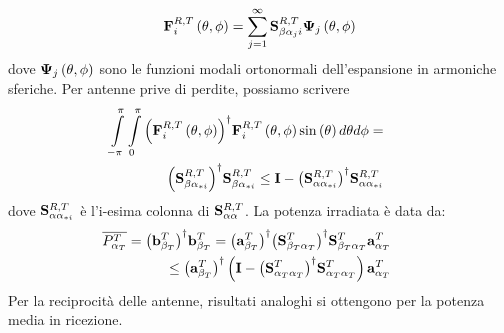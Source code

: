 \documentclass[technote]{IEEEtran}
\begin{document}
\[{\bf{F}}_i^{R,T}\left( {\theta ,\phi } \right) = \sum\limits_{j = 1}^\infty  {{\bf{S}}_{{\beta}{\alpha_ji}}^{R,T}{{\bf{\Psi }}_j}\left( {\theta ,\phi } \right)} \]
dove ${{\bf{\Psi }}_j}\left( {\theta ,\phi } \right)$ sono le funzioni modali ortonormali dell'espansione in armoniche sferiche. Per antenne prive di perdite, possiamo scrivere \cite{Was2005}
\begin{eqnarray}
\label{eq:patternOrtogonalization}
& & \hspace{-1cm} \int\limits_{ - \pi }^\pi  {\int\limits_0^\pi  {{{\left( {{\bf{F}}_i^{R,T}\left( {\theta ,\phi } \right)} \right)}^\dagger}{\bf{F}}_i^{R,T}\left( {\theta ,\phi } \right)} } \sin \left( \theta  \right)d\theta d\phi = \nonumber \\ 
& & {\left( {{\bf{S}}_{\beta {\alpha _{*i}}}^{R,T}} \right)^\dagger}{\bf{S}}_{\beta {\alpha _{*i}}}^{R,T} \le {\bf{I}} - {\left( {{\bf{S}}_{\alpha {\alpha _{*i}}}^{R,T}} \right)^\dagger}{\bf{S}}_{\alpha {\alpha _{*i}}}^{R,T}
\end{eqnarray} dove ${\bf{S}}_{\alpha {\alpha _{*i}}}^{R,T}$ è l'i-esima colonna di ${\bf{S}}_{\alpha \alpha }^{R,T}$. La potenza irradiata è data da:
\begin{eqnarray}
& & \hspace{-1cm} \overline{P_{{\alpha _T}}^{T}} = {\left( {{\bf{b}}_{{\beta _T}}^T} \right)^\dagger}{\bf{b}}_{{\beta _T}}^T = {\left( {{\bf{a}}_{{\beta _T}}^T} \right)^\dagger}{\left( {{\bf{S}}_{{\beta _T}{\alpha _T}}^T} \right)^\dagger}{\bf{S}}_{{\beta _T}{\alpha _T}}^T{\bf{a}}_{{\alpha _T}}^T \nonumber \\
& & \le {\left( {{\bf{a}}_{{\beta _T}}^T} \right)^\dagger}\left( {{\bf{I}} - {{\left( {{\bf{S}}_{{\alpha _T}{\alpha _T}}^T} \right)}^\dagger}{\bf{S}}_{{\alpha _T}{\alpha _T}}^T} \right){\bf{a}}_{{\alpha _T}}^T \nonumber
\end{eqnarray} Per la reciprocità delle antenne, risultati analoghi si ottengono per la potenza media in ricezione.
\end{document}
